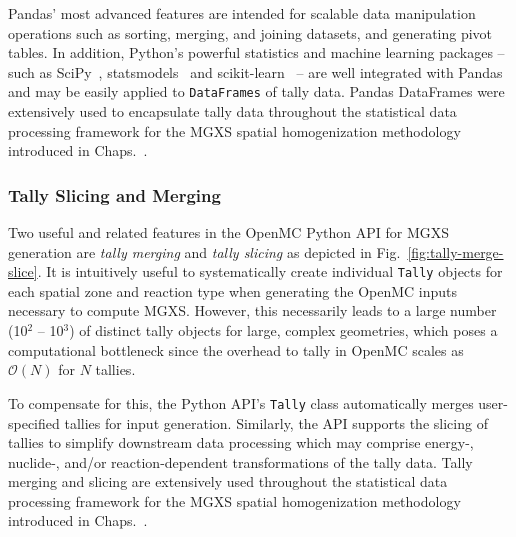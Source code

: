 Pandas' most advanced features are intended for scalable data manipulation operations such as sorting, merging, and joining datasets, and generating pivot tables. In addition, Python's powerful statistics and machine learning packages -- such as SciPy~\cite{jones2011scipy}, statsmodels~\cite{seabold2010statsmodels} and scikit-learn~\cite{pedregosa2011sklearn} -- are well integrated with Pandas and may be easily applied to \texttt{DataFrames} of tally data. Pandas DataFrames were extensively used to encapsulate tally data throughout the statistical data processing framework for the \ac{MGXS} spatial homogenization methodology introduced in Chaps.~.

\subsubsection{Tally Slicing and Merging}
\label{subsubsec:chap4-tally-slice-merge}

Two useful and related features in the OpenMC Python \ac{API} for \ac{MGXS} generation are \textit{tally merging} and \textit{tally slicing} as depicted in Fig.~\ref{fig:tally-merge-slice}. It is intuitively useful to systematically create individual \texttt{Tally} objects for each spatial zone and reaction type when generating the OpenMC inputs necessary to compute \ac{MGXS}. However, this necessarily leads to a large number (10$^2$ -- 10$^3$) of distinct tally objects for large, complex geometries, which poses a computational bottleneck since the overhead to tally in OpenMC scales as $\mathcal{O}(N)$ for $N$ tallies. 

To compensate for this, the Python \ac{API}'s \texttt{Tally} class automatically merges user-specified tallies for input generation. Similarly, the \ac{API} supports the slicing of tallies to simplify downstream data processing which may comprise energy-, nuclide-, and/or reaction-dependent transformations of the tally data. Tally merging and slicing are extensively used throughout the statistical data processing framework for the \ac{MGXS} spatial homogenization methodology introduced in Chaps.~.

